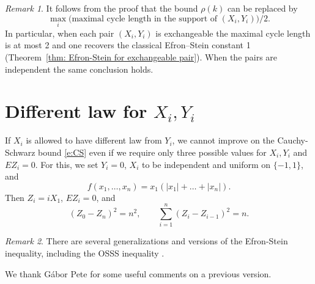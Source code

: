 \documentclass[letterpaper, 12pt]{article}
\theoremstyle{plain}
\theoremstyle{definition}
\theoremstyle{remark}
\newtheorem{remark}{Remark}
\begin{document}
\begin{remark}
It follows from the proof that the bound \(\rho(k)\) can be replaced by
\[
\max_i\bigl(\text{maximal cycle length in the support of }(X_i,Y_i)\bigr)/2.
\]
In particular, when each pair \((X_i,Y_i)\) is exchangeable the maximal cycle length is at most 2 and one recovers the classical Efron--Stein constant 1 (Theorem~\ref{thm: Efron-Stein for exchangeable pair}). When the pairs are independent the same conclusion holds.
\end{remark}

\section*{Different law for \(X_i,Y_i\)}

If \(X_i\) is allowed to have different law from \(Y_i\), we cannot improve on the Cauchy-Schwarz bound \eqref{e:CS} even if we require only three possible values for \(X_i,Y_i\) and \(EZ_i=0\). For this, we set \(Y_i=0\), \(X_i\) to be independent and uniform on \(\{-1,1\}\), and 
$$
f(x_1,\ldots,x_n)=x_1(|x_1|+\ldots+|x_n|).
$$
Then \(Z_i=iX_1\), \(EZ_i=0\), and
$$
(Z_0-Z_n)^2=n^2, \qquad \sum_{i=1}^n
(Z_{i}-Z_{i-1})^2=n.
$$

\begin{remark}
There are several generalizations and versions of the Efron-Stein inequality, including the OSSS inequality \cite{o2005every}.
\end{remark}

 We thank G\'abor Pete for some useful comments on a previous version.



\end{document}
